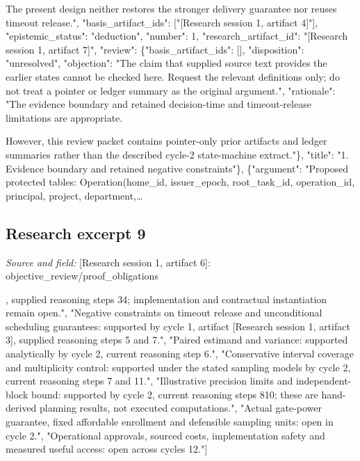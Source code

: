 \documentclass[11pt]{article}
\begin{document}
The present design neither restores the stronger delivery guarantee nor reuses timeout release.", "basis\_artifact\_ids": ["[Research session 1, artifact 4]"], "epistemic\_status": "deduction", "number": 1, "research\_artifact\_id": "[Research session 1, artifact 7]", "review": \{"basis\_artifact\_ids": [], "disposition": "unresolved", "objection": "The claim that supplied source text provides the earlier states cannot be checked here. Request the relevant definitions only; do not treat a pointer or ledger summary as the original argument.", "rationale": "The evidence boundary and retained decision-time and timeout-release limitations are appropriate.

However, this review packet contains pointer-only prior artifacts and ledger summaries rather than the described cycle-2 state-machine extract."\}, "title": "1. Evidence boundary and retained negative constraints"\}, \{"argument": "Proposed protected tables: Operation(home\_id, issuer\_epoch, root\_task\_id, operation\_id, principal, project, department,\ldots{}

\subsection{Research excerpt 9}
\textit{Source and field: }[Research session 1, artifact 6]: objective\_review/proof\_obligations\par
["Conditional reservation invariant: supported by cycle 1, artifact [Research session 1, artifact 3], supplied reasoning steps 3\textendash{}4; implementation and contractual instantiation remain open.", "Negative constraints on timeout release and unconditional scheduling guarantees: supported by cycle 1, artifact [Research session 1, artifact 3], supplied reasoning steps 5 and 7.", "Paired estimand and variance: supported analytically by cycle 2, current reasoning step 6.", "Conservative interval coverage and multiplicity control: supported under the stated sampling models by cycle 2, current reasoning steps 7 and 11.", "Illustrative precision limits and independent-block bound: supported by cycle 2, current reasoning steps 8\textendash{}10; these are hand-derived planning results, not executed computations.", "Actual gate-power guarantee, fixed affordable enrollment and defensible sampling units: open in cycle 2.", "Operational approvals, sourced costs, implementation safety and measured useful access: open across cycles 1\textendash{}2."]
\end{document}
